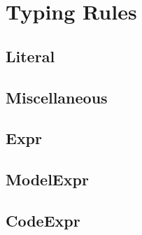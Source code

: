 \documentclass{article}
\begin{document}
\todototoc
\listoftodos

\section{Typing Rules}

\subsection{Literal}



\subsection{Miscellaneous}



\subsection{Expr}



\subsection{ModelExpr}



\subsection{CodeExpr}


\end{document}
